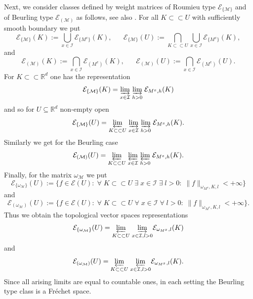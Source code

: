 \documentclass[10pt]{amsart}%
\numberwithin{equation}{section}
\theoremstyle{plain}
\newcommand{\RR}{\mathbb{R}}
\begin{document}
Next, we consider classes defined by weight matrices of Roumieu type $\mathcal{E}_{\{\mathcal{M}\}}$ and of Beurling type $\mathcal{E}_{(\mathcal{M})}$ as follows, see also \cite[4.2]{compositionpaper}. For all $K\subset\subset U$ with sufficiently smooth boundary we put
\begin{equation*}%
\mathcal{E}_{\{\mathcal{M}\}}(K):=\bigcup_{x\in\mathcal{I}}\mathcal{E}_{\{M^x\}}(K),\hspace{20pt}\mathcal{E}_{\{\mathcal{M}\}}(U):=\bigcap_{K\subset\subset U}\bigcup_{x\in\mathcal{I}}\mathcal{E}_{\{M^x\}}(K),
\end{equation*}
and
\begin{equation*}%
\mathcal{E}_{(\mathcal{M})}(K):=\bigcap_{x\in\mathcal{I}}\mathcal{E}_{(M^x)}(K),\hspace{20pt}\mathcal{E}_{(\mathcal{M})}(U):=\bigcap_{x\in\mathcal{I}}\mathcal{E}_{(M^x)}(U).
\end{equation*}
For $K\subset\subset\RR^d$ one has the representation
$$\mathcal{E}_{\{\mathcal{M}\}}(K)=\underset{x\in\mathcal{I}}{\varinjlim}\;\underset{h>0}{\varinjlim}\;\mathcal{E}_{M^x,h}(K)$$
and so for $U\subseteq\RR^d$ non-empty open
\begin{equation*}%
\mathcal{E}_{\{\mathcal{M}\}}(U)=\underset{K\subset\subset U}{\varprojlim}\;\underset{x\in\mathcal{I}}{\varinjlim}\;\underset{h>0}{\varinjlim}\;\mathcal{E}_{M^x,h}(K).
\end{equation*}
Similarly we get for the Beurling case
\begin{equation*}%
\mathcal{E}_{(\mathcal{M})}(U)=\underset{K\subset\subset U}{\varprojlim}\;\underset{x\in\mathcal{I}}{\varprojlim}\;\underset{h>0}{\varprojlim}\;\mathcal{E}_{M^x,h}(K).
\end{equation*}
Finally, for the matrix $\omega_{\mathcal{M}}$ we put
$$\mathcal{E}_{\{\omega_{\mathcal{M}}\}}(U):=\{f\in\mathcal{E}(U):\;\forall\;K\subset\subset U\;\exists\;x\in\mathcal{I}\;\exists\;l>0:\;\|f\|_{\omega_{M^x},K,l}<+\infty\}$$
and
$$\mathcal{E}_{(\omega_{\mathcal{M}})}(U):=\{f\in\mathcal{E}(U):\;\forall\;K\subset\subset U\;\forall\;x\in\mathcal{I}\;\forall\;l>0:\;\|f\|_{\omega_{M^x},K,l}<+\infty\}.$$
Thus we obtain the topological vector spaces representations
\begin{equation*}%
\mathcal{E}_{\{\omega_{\mathcal{M}}\}}(U)=\underset{K\subset\subset U}{\varprojlim}\;\underset{x\in\mathcal{I},l>0}{\varinjlim}\mathcal{E}_{\omega_{M^x},l}(K)
\end{equation*}
and
\begin{equation*}%
\mathcal{E}_{(\omega_{\mathcal{M}})}(U)=\underset{K\subset\subset U}{\varprojlim}\;\underset{x\in\mathcal{I},l>0}{\varprojlim}\mathcal{E}_{\omega_{M^x},l}(K).
\end{equation*}
Since all arising limits are equal to countable ones, in each setting the Beurling type class is a Fr\'{e}chet space.
\end{document}
